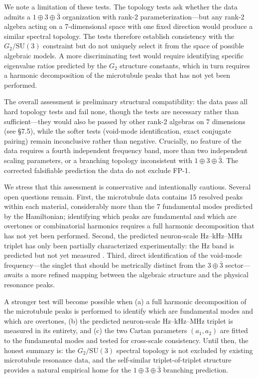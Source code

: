 \documentclass[12pt,a4paper]{article}
\begin{document}
We note a limitation of these tests. The topology tests ask whether the data admits a $1 \oplus 3 \oplus \bar{3}$ organization with rank-2 parameterization---but any rank-2 algebra acting on a 7-dimensional space with one fixed direction would produce a similar spectral topology. The tests therefore establish consistency with the $G_2/\mathrm{SU}(3)$ constraint but do not uniquely select it from the space of possible algebraic models. A more discriminating test would require identifying specific eigenvalue ratios predicted by the $G_2$ structure constants, which in turn requires a harmonic decomposition of the microtubule peaks that has not yet been performed.

The overall assessment is preliminary structural compatibility: the data pass all hard topology tests and fail none, though the tests are necessary rather than sufficient---they would also be passed by other rank-2 algebras on 7 dimensions (see \S7.5), while the softer tests (void-mode identification, exact conjugate pairing) remain inconclusive rather than negative. Crucially, no feature of the data requires a fourth independent frequency band, more than two independent scaling parameters, or a branching topology inconsistent with $1 \oplus 3 \oplus \bar{3}$. The corrected falsifiable prediction the data do not exclude FP-1.

We stress that this assessment is conservative and intentionally cautious. Several open questions remain. First, the microtubule data contains 15 resolved peaks within each material, considerably more than the 7 fundamental modes predicted by the Hamiltonian; identifying which peaks are fundamental and which are overtones or combinatorial harmonics requires a full harmonic decomposition that has not yet been performed. Second, the predicted neuron-scale Hz--kHz--MHz triplet has only been partially characterized experimentally: the Hz band is predicted but not yet measured \citep{Saxena2020}. Third, direct identification of the void-mode frequency---the singlet that should be metrically distinct from the $3 \oplus \bar{3}$ sector---awaits a more refined mapping between the algebraic structure and the physical resonance peaks.

A stronger test will become possible when (a) a full harmonic decomposition of the microtubule peaks is performed to identify which are fundamental modes and which are overtones, (b) the predicted neuron-scale Hz--kHz--MHz triplet is measured in its entirety, and (c) the two Cartan parameters $(a_1, a_2)$ are fitted to the fundamental modes and tested for cross-scale consistency. Until then, the honest summary is: the $G_2/\mathrm{SU}(3)$ spectral topology is not excluded by existing microtubule resonance data, and the self-similar triplet-of-triplet structure provides a natural empirical home for the $1 \oplus 3 \oplus \bar{3}$ branching prediction.
\end{document}
